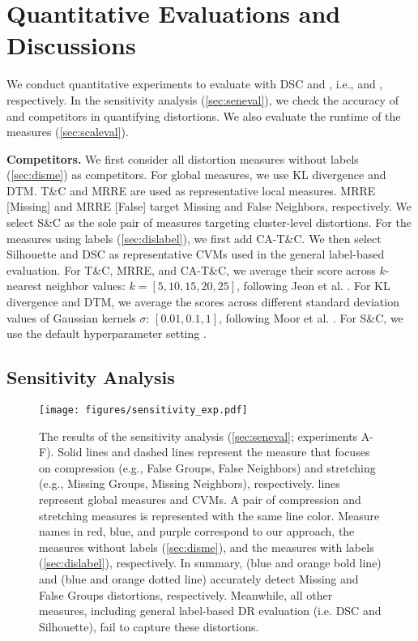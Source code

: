 \section{Quantitative Evaluations and Discussions}





We conduct quantitative experiments to evaluate \ltc with DSC and \CHb, i.e., \ltc [DSC] and \ltc [\CHb{}], respectively. In the sensitivity analysis  (\autoref{sec:seneval}), we check the accuracy of \ltc and competitors in quantifying distortions.
We also evaluate the runtime of the measures (\autoref{sec:scaleval}). 



\noindent
\textbf{Competitors.} 
We first consider all distortion measures without labels (\autoref{sec:disme}) as competitors. 
For global measures, we use KL divergence and DTM. T\&C and MRRE are used as representative local measures. MRRE [Missing] and MRRE [False] target Missing and False Neighbors, respectively.
We select S\&C as the sole pair of measures targeting cluster-level distortions. 
For the measures using labels (\autoref{sec:dislabel}), we first add CA-T\&C. We then select Silhouette and DSC as representative CVMs used in the general label-based evaluation. 
For T\&C, MRRE, and CA-T\&C, we average their score across $k$-nearest neighbor values: $k = [5, 10, 15, 20, 25]$, following Jeon et al. \cite{jeon21tvcg}. For KL divergence and DTM, we average the scores across different standard deviation values of Gaussian kernels $\sigma$: $[0.01, 0.1, 1]$, following Moor et al. \cite{moor20icml}. For S\&C, we use the default hyperparameter setting \cite{jeon21tvcg}. 



\subsection{Sensitivity Analysis}
\label{sec:seneval}

\label{sec:eval}
\begin{figure*}[ht]
    \centering
    \texttt{[image: figures/sensitivity\_exp.pdf]} \vspace{-6mm}
    \caption{The results of the sensitivity analysis (\autoref{sec:seneval}; experiments A-F). Solid lines and dashed lines represent the measure that focuses on compression (e.g., False Groups, False Neighbors) and stretching (e.g., Missing Groups, Missing Neighbors), respectively.  lines represent global measures and CVMs. A pair of compression and stretching measures is represented with the same line color. 
    Measure names in red, blue, and purple correspond to our approach, the measures without labels (\autoref{sec:disme}), and the measures with labels (\autoref{sec:dislabel}), respectively.
    In summary, \lt (blue and orange bold line) and \lc (blue and orange dotted line) accurately detect Missing and False Groups distortions, respectively. Meanwhile, all other measures, including general label-based DR evaluation (i.e. DSC and Silhouette), fail to capture these distortions. \vspace{-3mm}}
    \label{fig:senexp}
\end{figure*}

